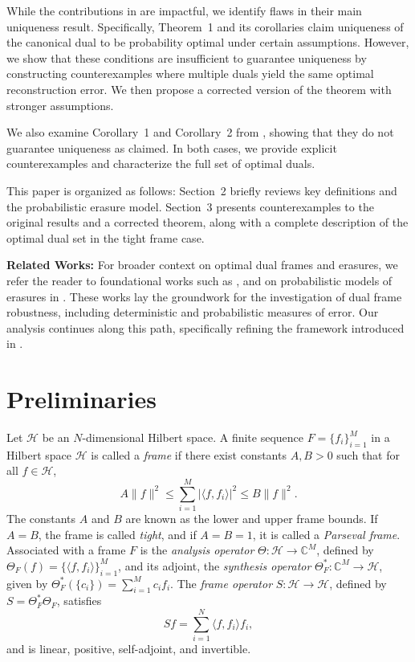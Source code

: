 \documentclass[final,1p,times]{elsarticle}
\begin{document}
While the contributions in \cite{li1} are impactful, we identify flaws in their main uniqueness result. Specifically, Theorem~1 and its corollaries claim uniqueness of the canonical dual to be probability optimal under certain assumptions. However, we show that these conditions are insufficient to guarantee uniqueness by constructing counterexamples where multiple duals yield the same optimal reconstruction error. We then propose a corrected version of the theorem with stronger assumptions.

We also examine Corollary~1 and Corollary~2 from \cite{li1}, showing that they do not guarantee uniqueness as claimed. In both cases, we provide explicit counterexamples and characterize the full set of optimal duals.

This paper is organized as follows: Section~2 briefly reviews key definitions and the probabilistic erasure model. Section~3 presents counterexamples to the original results and a corrected theorem, along with a complete description of the optimal dual set in the tight frame case.


\medskip

{\small
\noindent \textbf{Related Works:} For broader context on optimal dual frames and erasures, we refer the reader to foundational works such as \cite{holm, leng3, bodm1, peh, sali, jerr, goya, jins, jerr, dev, ara, shan2}, and on probabilistic models of erasures in \cite{leng, li}. These works lay the groundwork for the investigation of dual frame robustness, including deterministic and probabilistic measures of error. Our analysis continues along this path, specifically refining the framework introduced in \cite{li1}.
}

	

	
\section{Preliminaries}

Let $\mathcal{H}$ be an $N$-dimensional Hilbert space.  A finite sequence \( F = \{f_i\}_{i=1}^M \) in a Hilbert space \( \mathcal{H} \) is called a \emph{frame} if there exist constants \( A, B > 0 \) such that for all \( f \in \mathcal{H} \),
\[
A\|f\|^2 \leq \sum_{i=1}^M |\langle f, f_i \rangle|^2 \leq B\|f\|^2.
\]
The constants \( A \) and \( B \) are known as the lower and upper frame bounds. If \( A = B \), the frame is called \emph{tight}, and if \( A = B = 1 \), it is called a \emph{Parseval frame}. Associated with a frame \( F \) is the \emph{analysis operator} \( \Theta: \mathcal{H} \to \mathbb{C}^M \), defined by \( \Theta_{F}(f) = \{\langle f, f_i \rangle\}_{i=1}^M \), and its adjoint, the \emph{synthesis operator} \( \Theta_F^*: \mathbb{C}^M \to \mathcal{H} \), given by \( \Theta_F^*(\{c_i\}) = \sum_{i=1}^M c_i f_i \). The \emph{frame operator} \( S: \mathcal{H} \to \mathcal{H} \), defined by \( S = \Theta_F^* \Theta_F \), satisfies
\[
S f = \sum_{i=1}^N \langle f, f_i \rangle f_i,
\]
and is linear, positive, self-adjoint, and invertible.
\end{document}
